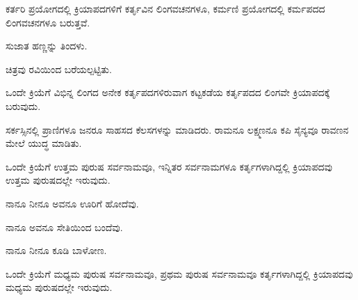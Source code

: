 \vspace{2.5pt plus 3pt minus 0.5pt}\noindent\hspace*{1.2em}\kbvnum{{[}2{]}}\hspace{0.55em}ಕರ್ತರಿ ಪ್ರಯೋಗದಲ್ಲಿ ಕ್ರಿಯಾಪದಗಳಿಗೆ ಕರ್ತೃವಿನ ಲಿಂಗವಚನಗಳೂ, ಕರ್ಮಣಿ ಪ್ರಯೋಗದಲ್ಲಿ ಕರ್ಮಪದದ ಲಿಂಗವಚನಗಳೂ ಬರುತ್ತವೆ.\par

\noindent\hspace*{1.2em}\hspace{0.6em}ಸುಜಾತ ಹಣ್ಣನ್ನು ತಿಂದಳು.\par

\noindent\hspace*{2.2em}ಚಿತ್ರವು ರವಿಯಿಂದ ಬರೆಯಲ್ಪಟ್ಟಿತು.\par

\vspace{2.5pt plus 3pt minus 0.5pt}\noindent\hspace*{1.2em}\kbvnum{{[}3{]}}\hspace{0.55em}ಒಂದೇ ಕ್ರಿಯೆಗೆ ವಿಭಿನ್ನ ಲಿಂಗದ ಅನೇಕ ಕರ್ತೃಪದಗಳಿರುವಾಗ ಕಟ್ಟಕಡೆಯ ಕರ್ತೃಪದದ ಲಿಂಗವೇ ಕ್ರಿಯಾಪದಕ್ಕೆ ಬರುವುದು.\par

\noindent\hspace*{1.2em}\hspace{0.6em}ಸರ್ಕಸ್ಸಿನಲ್ಲಿ ಪ್ರಾಣಿಗಳೂ ಜನರೂ ಸಾಹಸದ ಕೆಲಸಗಳನ್ನು ಮಾಡಿದರು. ರಾಮನೂ ಲಕ್ಷ್ಮಣನೂ ಕಪಿ ಸೈನ್ಯವೂ ರಾವಣನ ಮೇಲೆ ಯುದ್ಧ ಮಾಡಿತು.\par

\vspace{2.5pt plus 3pt minus 0.5pt}\noindent\hspace*{1.2em}\kbvnum{{[}4{]}}\hspace{0.55em}ಒಂದೇ ಕ್ರಿಯೆಗೆ ಉತ್ತಮ ಪುರುಷ ಸರ್ವನಾಮವೂ, ಇನ್ನಿತರ ಸರ್ವನಾಮಗಳೂ ಕರ್ತೃಗಳಾಗಿದ್ದಲ್ಲಿ ಕ್ರಿಯಾಪದವು ಉತ್ತಮ ಪುರುಷದಲ್ಲೇ ಇರುವುದು.\par

\noindent\hspace*{1.2em}\hspace{0.6em}ನಾನೂ ನೀನೂ ಅವನೂ ಊರಿಗೆ ಹೋದೆವು.\par

\noindent\hspace*{2.2em}ನಾನೂ ಅವನೂ ಸೇತಿಯಿಂದ ಬಂದೆವು.\par

\noindent\hspace*{2.2em}ನಾನೂ ನೀನೂ ಕೂಡಿ ಬಾಳೋಣ.\par

\vspace{2.5pt plus 3pt minus 0.5pt}\noindent\hspace*{1.2em}\kbvnum{{[}5{]}}\hspace{0.55em}ಒಂದೇ ಕ್ರಿಯೆಗೆ ಮಧ್ಯಮ ಪುರುಷ ಸರ್ವನಾಮವೂ, ಪ್ರಥಮ ಪುರುಷ ಸರ್ವನಾಮವೂ ಕರ್ತೃಗಳಾಗಿದ್ದಲ್ಲಿ ಕ್ರಿಯಾಪದವು ಮಧ್ಯಮ ಪುರುಷದಲ್ಲೇ ಇರುವುದು.\par

